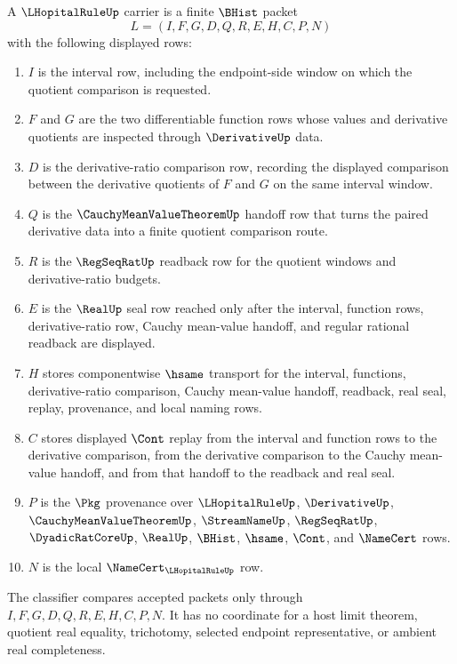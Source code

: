 \begin{definition}
\label{def:lhopital-rule-carrier}
A $\LHopitalRuleUp$ carrier is a finite $\BHist$ packet
$$
L=(I,F,G,D,Q,R,E,H,C,P,N)
$$
with the following displayed rows:
\begin{enumerate}
\item $I$ is the interval row, including the endpoint-side window on which the quotient comparison is requested.
\item $F$ and $G$ are the two differentiable function rows whose values and derivative quotients are inspected through $\DerivativeUp$ data.
\item $D$ is the derivative-ratio comparison row, recording the displayed comparison between the derivative quotients of $F$ and $G$ on the same interval window.
\item $Q$ is the $\CauchyMeanValueTheoremUp$ handoff row that turns the paired derivative data into a finite quotient comparison route.
\item $R$ is the $\RegSeqRatUp$ readback row for the quotient windows and derivative-ratio budgets.
\item $E$ is the $\RealUp$ seal row reached only after the interval, function rows, derivative-ratio row, Cauchy mean-value handoff, and regular rational readback are displayed.
\item $H$ stores componentwise $\hsame$ transport for the interval, functions, derivative-ratio comparison, Cauchy mean-value handoff, readback, real seal, replay, provenance, and local naming rows.
\item $C$ stores displayed $\Cont$ replay from the interval and function rows to the derivative comparison, from the derivative comparison to the Cauchy mean-value handoff, and from that handoff to the readback and real seal.
\item $P$ is the $\Pkg$ provenance over $\LHopitalRuleUp$, $\DerivativeUp$, $\CauchyMeanValueTheoremUp$, $\StreamNameUp$, $\RegSeqRatUp$, $\DyadicRatCoreUp$, $\RealUp$, $\BHist$, $\hsame$, $\Cont$, and $\NameCert$ rows.
\item $N$ is the local $\NameCert_{\LHopitalRuleUp}$ row.
\end{enumerate}
The classifier compares accepted packets only through $I,F,G,D,Q,R,E,H,C,P,N$. It has no coordinate for a host limit theorem, quotient real equality, trichotomy, selected endpoint representative, or ambient real completeness.
\end{definition}

